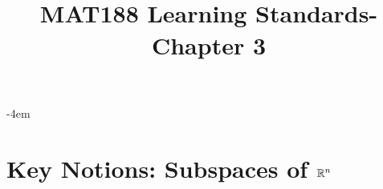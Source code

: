 \documentclass[12pt,oneside,english]{amsart}
\newif\ifshowSoln
\begin{document}
	
\title{
	\textbf{	 \\ MAT188 Learning Standards-Chapter 3
        }  
	\ifshowSoln
	and notes for instructors
	\else
{}
	\fi
}

\kern -4em

\maketitle

\section*{\color{blue} Key Notions: Subspaces of $\mathbb{R}^n$
    }

\end{document}
